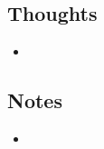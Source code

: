 \documentclass{article}
\begin{document}
\section{}

\subsection{Thoughts}
\begin{itemize}
    \item
\end{itemize}

\subsection{Notes}
\begin{itemize}
    \item
\end{itemize}
\end{document}
